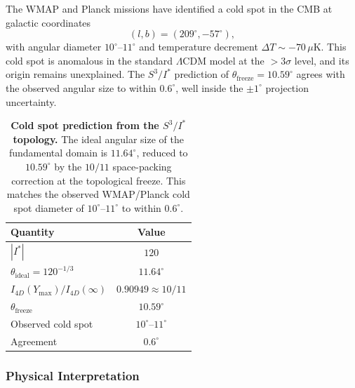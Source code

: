 \documentclass[12pt,oneside,openany]{book}
\begin{document}
The WMAP and Planck missions have identified a cold spot in the CMB at galactic coordinates
\begin{equation}
(l, b) = (209^\circ, -57^\circ),
\label{eq:coldspot-position}
\end{equation}
with angular diameter $10^\circ$--$11^\circ$ and temperature decrement $\Delta T \sim -70\,\mu\mathrm{K}$. This cold spot is anomalous in the standard $\Lambda$CDM model at the $>3\sigma$ level, and its origin remains unexplained. The $S^3/I^*$ prediction of $\theta_{\mathrm{freeze}} = 10.59^\circ$ agrees with the observed angular size to within $0.6^\circ$, well inside the $\pm 1^\circ$ projection uncertainty.

\begin{table}[htbp]
\centering
\caption{\textbf{Cold spot prediction from the $S^3/I^*$ topology.} The ideal angular size of the fundamental domain is $11.64^\circ$, reduced to $10.59^\circ$ by the $10/11$ space-packing correction at the topological freeze. This matches the observed WMAP/Planck cold spot diameter of $10^\circ$--$11^\circ$ to within $0.6^\circ$.}
\label{tab:coldspot}
\begin{tabular}{@{}lc@{}}
\toprule
\textbf{Quantity} & \textbf{Value} \\
\midrule
$|I^*|$ & $120$ \\
$\theta_{\mathrm{ideal}} = 120^{-1/3}$ & $11.64^\circ$ \\
$I_{4D}(Y_{\max})/I_{4D}(\infty)$ & $0.90949 \approx 10/11$ \\
$\theta_{\mathrm{freeze}}$ & $10.59^\circ$ \\
Observed cold spot & $10^\circ$--$11^\circ$ \\
Agreement & $0.6^\circ$ \\
\bottomrule
\end{tabular}
\end{table}

\subsubsection{Physical Interpretation}
\end{document}
